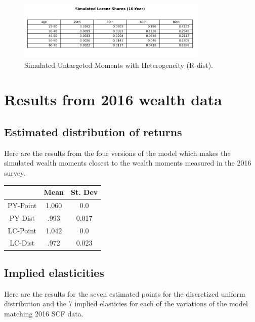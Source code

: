 \begin{figure}[htbp]
\centering
\includegraphics[width=0.8\textwidth]{Tables/Sim_Lorenz_10yr_LCrrDistNetWorth_2013.png}
\caption{Simulated Untargeted Moments with Heterogeneity (R-dist).}
\label{fig:SimLorenzTarDist2013}
\end{figure}

\section{Results from 2016 wealth data}

\subsection{Estimated distribution of returns}

\par Here are the results from the four versions of the model  which makes the simulated wealth moments closest to the wealth moments measured in the 2016 survey.

\begin{center}
    \begin{tabular}{|c|c|c|}
\hline
& Mean & St. Dev \\
\hline
PY-Point & 1.060 & 0.0  \\
PY-Dist & .993  &  0.017  \\
LC-Point & 1.042 & 0.0  \\
LC-Dist & .972  &  0.023 \\
\hline
    \end{tabular}
    \end{center}

\subsection{Implied elasticities}

\par Here are the results for the seven estimated points for the discretized uniform distribution and the 7 implied elasticies for each of the variations of the model matching 2016 SCF data. 

